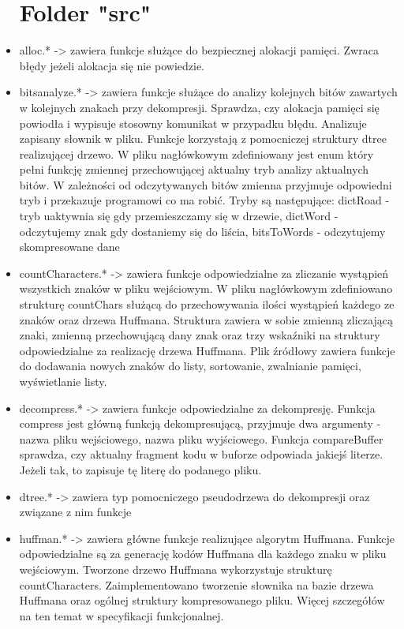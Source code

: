 \documentclass[]{article}
\begin{document}
\begin{itemize}
\section{Folder "src"}\label{header-n231}
\item
alloc.* -> zawiera funkcje służące do bezpiecznej alokacji pamięci. Zwraca błędy jeżeli alokacja się nie powiedzie.
\item
bits\textunderscore analyze.* -> zawiera funkcje służące do analizy kolejnych bitów zawartych w kolejnych znakach przy dekompresji. Sprawdza, czy alokacja pamięci się powiodła i wypisuje stosowny komunikat w przypadku błędu. Analizuje zapisany słownik w pliku. Funkcje korzystają z pomocniczej struktury dtree realizującej drzewo. W pliku nagłówkowym zdefiniowany jest enum który pełni funkcję zmiennej przechowującej aktualny tryb analizy aktualnych bitów. W zależności od odczytywanych bitów zmienna przyjmuje odpowiedni tryb i przekazuje programowi co ma robić. Tryby są następujące: dictRoad - tryb uaktywnia się gdy przemieszczamy się w drzewie, dictWord - odczytujemy znak gdy dostaniemy się do liścia, bitsToWords - odczytujemy skompresowane dane
\item
countCharacters.* -> zawiera funkcje odpowiedzialne za zliczanie wystąpień wszystkich znaków w pliku wejściowym. W pliku nagłówkowym zdefiniowano strukturę countChars służącą do przechowywania ilości wystąpień każdego ze znaków oraz drzewa Huffmana. Struktura zawiera w sobie zmienną zliczającą znaki, zmienną przechowującą dany znak oraz trzy wskaźniki na struktury odpowiedzialne za realizację drzewa Huffmana. Plik źródłowy zawiera funkcje do dodawania nowych znaków do listy, sortowanie, zwalnianie pamięci, wyświetlanie listy.
\item
decompress.* -> zawiera funkcje odpowiedzialne za dekompresję. Funkcja compress jest główną funkcją dekompresującą, przyjmuje dwa argumenty - nazwa pliku wejściowego, nazwa pliku wyjściowego. Funkcja compareBuffer sprawdza, czy aktualny fragment kodu w buforze odpowiada jakiejś literze. Jeżeli tak, to zapisuje tę literę do podanego pliku.
\item
dtree.* -> zawiera typ pomocniczego pseudodrzewa do dekompresji oraz związane z nim funkcje
\item
huffman.* -> zawiera główne funkcje realizujące algorytm Huffmana. Funkcje odpowiedzialne są za generację kodów Huffmana dla każdego znaku w pliku wejściowym. Tworzone drzewo Huffmana wykorzystuje strukturę countCharacters. Zaimplementowano tworzenie słownika na bazie drzewa Huffmana oraz ogólnej struktury kompresowanego pliku.  Więcej szczegółów na ten temat w specyfikacji funkcjonalnej.

\end{itemize}
\end{document}
